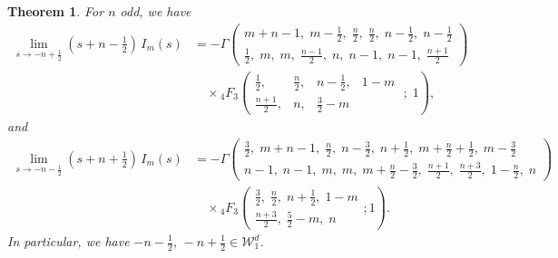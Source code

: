 \documentclass[10pt,a4paper]{amsart}
\newtheorem{theorem}{Theorem}
\begin{document}
\begin{theorem}
    For $n$ odd, we have
    \begin{align*}
  \lim_{s\rightarrow -n+\frac{1}{2}} (s+n-\frac{1}{2})\,I_m(s) &=  - \Gamma\!\left(
\begin{matrix}
m+n-1,\; m-\frac12,\; \frac n2,\; \frac n2,\; n-\frac12,\; n-\frac12
\\[3pt]
\frac12, \; m, \; m, \; \frac{n-1}{2}, \; n, \; n-1, \; n-1, \; \frac{n+1}{2}
\end{matrix}
\right)\\[3pt]
& \quad \times {}_4F_3\left( \begin{matrix} \frac{1}{2}, & \frac{n}{2}, & n-\frac{1}{2}, & 1-m \\ \frac{n+1}{2}, & n, & \frac{3}{2}-m \end{matrix} \;;\; 1 \right),
\end{align*}
and
\begin{align*}
     \lim_{s\rightarrow -n-\frac{1}{2}} (s+n+\frac{1}{2})\,I_m(s) &=
-\Gamma\!\left(
\begin{matrix}
\frac32, \; m+n-1,\; \frac n2,\; n-\frac32,\; n+\frac12,\;
m+\frac n2+\frac12,\; m-\frac32
\\[3pt]
n-1,\; n-1,\; m,\; m,\; m+\frac n2-\frac32,\;
\frac{n+1}{2},\; \frac{n+3}{2},\; 1-\frac n2,\; n
\end{matrix}
\right)
\\[3pt]
&\quad \times
{}_4F_3 \left(
\begin{matrix}
\frac32,\; \frac n2,\; n+\frac12,\; 1-m\\[3pt]
\frac{n+3}{2},\; \frac52-m,\; n
\end{matrix};1
\right).
 \end{align*}
In particular, we have  $-n-\frac{1}{2}, \, -n+\frac{1}{2} \in \mathcal{W}^d_1$.
\end{theorem}
\end{document}

